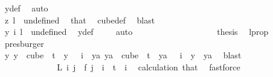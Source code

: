 \begin{isabellebody}
\ y{\isacharunderscore}{\kern0pt}def\ \isamarkupfalse%
\ auto\isanewline
\ \ \ \ \ \ \ \ \ \ \ \ \ \ \isamarkupfalse%
\isanewline
\ \ \ \ \ \ \ \ \ \ \ \ \ \ \ \ \isamarkupfalse%
\ {}\isanewline
\ \ \ \ \ \ \ \ \ \ \ \ \ \ \ \ \isamarkupfalse%
\ \isamarkupfalse%
\ {\isachardoublequoteopen}z\ l\ {\isacharequal}{\kern0pt}\ undefined{\isachardoublequoteclose}\ \isamarkupfalse%
\ that\ \isamarkupfalse%
\ cube{\isacharunderscore}{\kern0pt}def\ \isamarkupfalse%
\ blast\isanewline
\ \ \ \ \ \ \ \ \ \ \ \ \ \ \ \ \isamarkupfalse%
\ \isamarkupfalse%
\ {\isachardoublequoteopen}y\ i\ l\ {\isacharequal}{\kern0pt}\ undefined{\isachardoublequoteclose}\ \isamarkupfalse%
\ y{\isacharunderscore}{\kern0pt}def\ \isamarkupfalse%
\ {}\ \isamarkupfalse%
\ auto\isanewline
\ \ \ \ \ \ \ \ \ \ \ \ \ \ \ \ \isamarkupfalse%
\ \isamarkupfalse%
\ {\isacharquery}{\kern0pt}thesis\ \isamarkupfalse%
\ l{\isacharunderscore}{\kern0pt}prop\ \isamarkupfalse%
\ presburger\isanewline
\ \ \ \ \ \ \ \ \ \ \ \ \ \ \isamarkupfalse%
\isanewline
\ \ \ \ \ \ \ \ \ \ \ \ \isamarkupfalse%
\isanewline
\ \ \ \ \ \ \ \ \ \ \ \ \isamarkupfalse%
\ \isamarkupfalse%
\ {\isachardoublequoteopen}{\isasymexists}y{\isachardot}{\kern0pt}\ {\isacharparenleft}{\kern0pt}y\ {\isasymin}\ cube\ {}\ t\ {\isasymand}\ y\ {}\ {\isacharequal}{\kern0pt}\ i{\isacharparenright}{\kern0pt}\ {\isasymand}\ {\isacharparenleft}{\kern0pt}{\isasymforall}ya{\isachardot}{\kern0pt}\ ya\ {\isasymin}\ cube\ {}\ t\ {\isasymand}\ ya\ {}\ {\isacharequal}{\kern0pt}\ i\ {\isasymlongrightarrow}\ y\ {\isacharequal}{\kern0pt}\ ya{\isacharparenright}{\kern0pt}{\isachardoublequoteclose}\ \isamarkupfalse%
\ blast\isanewline
\isanewline
\ \ \ \ \ \ \ \ \ \ \isamarkupfalse%
\isanewline
\ \ \ \ \ \ \ \ \ \ \isamarkupfalse%
\ \isamarkupfalse%
\ {\isachardoublequoteopen}L\ i\ j\ {\isacharequal}{\kern0pt}\ f\ j{\isachardoublequoteclose}\ \ {\isachardoublequoteopen}i\ {\isacharless}{\kern0pt}\ t{\isachardoublequoteclose}\ \ i\ \isamarkupfalse%
\ calculation\ that\ \isamarkupfalse%
\ fastforce\isanewline

\end{isabellebody}
